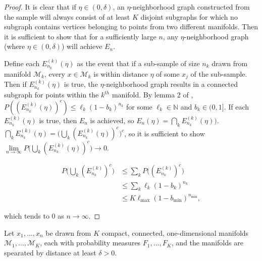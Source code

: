 \documentclass[12pt]{article}
\begin{document}
\begin{proof}
It is clear that if $\eta \in (0, \delta)$, an $\eta$-neighborhood graph constructed from the sample will always consist of at least $K$ disjoint subgraphs for which no subgraph contains vertices belonging to points from two different manifolds. 
Then it is sufficient to show that for a sufficiently large $n$, any $\eta$-neighborhood graph (where $\eta \in (0, \delta)$) will achieve $E_n$. 

Define each $E_{n_k}^{(k)}(\eta)$ as the event that if a sub-sample of size $n_k$ drawn from manifold $\mathcal{M}_k$, every $x \in \mathcal{M}_k$ is within distance $\eta$ of some $x_j$ of the sub-sample. 
Then if $E_{n_k}^{(k)}(\eta)$ is true, the $\eta$-neighborhood graph results in a connected subgraph for points within the $k^{th}$ manifold. 
By lemma 2 of \citet{trosset2020rehabilitating}, $P((E_{n_k}^{(k)}(\eta))^c) \leq \ell_k (1 - b_k)^{n_k}$ for some $\ell_k \in \mathbb{N}$ and $b_k \in (0, 1]$. 
If each $E_{n_k}^{(k)}(\eta)$ is true, then $E_n$ is achieved, so $E_n(\eta) = \bigcap_k E_{n_k}^{(k)}(\eta))$. 
$\bigcap_k E_{n_k}^{(k)}(\eta) = \Big( \bigcup_k (E_{n_k}^{(k)}(\eta))^c \Big)^c$, so it is sufficient to show $\lim\limits_{n \to \infty} P \big( \bigcup_k (E_{n_k}^{(k)}(\eta))^c \big) \to 0$. 

$$
\begin{aligned}
P \big( \bigcup_k(E_{n_k}^{(k)})^c \big) & \leq \sum_k P \big((E_{n_k}^{(k)})^c \big) \\
& \leq \sum_k \ell_k (1 - b_k)^{n_k} \\
& \leq K \ell_{\max} (1 - b_{\min})^{n_{\min}},
\end{aligned}
$$

which tends to $0$ as $n \to \infty$. 
\end{proof}

\begin{corollary}
Let $x_1, ..., x_n$ be drawn from $K$ compact, connected, one-dimensional manifolds $\mathcal{M}_1, ..., \mathcal{M}_K$, each with probability measures $F_1, ..., F_K$, and the manifolds are spearated by distance at least $\delta > 0$. 

\end{corollary}
\end{document}
